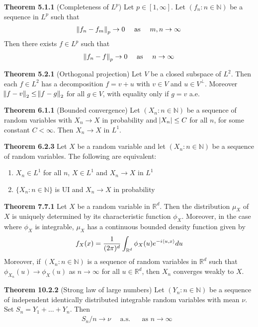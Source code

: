 \documentclass[hidelinks, 12pt]{article}
\theoremstyle{mydefstyle}
\theoremstyle{mythmstyle}
\begin{document}
\textbf{Theorem 5.1.1} (Completeness of $L^p$) Let $p \in [1, \infty]$. Let $(f_n : n \in \mathbb{N})$ be a sequence in $L^p$ such that
\begin{gather*}
\norm{f_n - f_m}_p \to 0 \quad\mbox{ as }\quad m, n \to \infty
\end{gather*}
Then there exists $f \in L^p$ such that
\begin{gather*}
\norm{f_n - f}_p \to 0 \quad\mbox{ as }\quad n \to \infty
\end{gather*}

\textbf{Theorem 5.2.1} (Orthogonal projection) Let $V$ be a closed subspace of $L^2$. Then each $f \in L^2$ has a decomposition $f = v + u$ with $v \in V$ and $u \in V^{\perp}$. Moreover $\norm{f - v}_2 \le \norm{f - g}_2$ for all $g \in V$, with equality only if $g = v$ a.e.

\textbf{Theorem 6.1.1} (Bounded convergence) Let $(X_n : n \in \mathbb{N})$ be a sequence of random variables with $X_n \to X$ in probability and $\abs{X_n} \le C$ for all $n$, for some constant $C < \infty$. Then $X_n \to X$ in $L^1$. 

\textbf{Theorem 6.2.3} Let $X$ be a random variable and let $(X_n : n \in \mathbb{N})$ be a sequence of random variables. The following are equivalent:
\begin{enumerate}[label = (\alph*)]
\item $X_n \in L^1$ for all $n$, $X \in L^1$ and $X_n \to X$ in $L^1$
\item $\{X_n : n \in \mathbb{N}\}$ is UI and $X_n \to X$ in probability
\end{enumerate}

\textbf{Theorem 7.7.1} Let $X$ be a random variable in $\mathbb{R}^d$. Then the distribution $\mu_X$ of $X$ is uniquely determined by its characteristic function $\phi_X$. Moreover, in the case where $\phi_X$ is integrable, $\mu_X$ has a continuous bounded density function given by
\begin{gather*}
f_X(x) = \frac{1}{(2\pi)^d} \int_{\mathbb{R}^d} \phi_X(u) e^{-i\braket{u, x}} du
\end{gather*}
Moreover, if $(X_n : n \in \mathbb{N})$ is a sequence of random variables in $\mathbb{R}^d$ such that $\phi_{X_n}(u) \to \phi_X(u)$ as $n \to \infty$ for all $u \in \mathbb{R}^d$, then $X_n$ converges weakly to $X$. 

\textbf{Theorem 10.2.2} (Strong law of large numbers) Let $(Y_n : n \in \mathbb{N})$ be a sequence of independent identically distributed integrable random variables with mean $\nu$. Set $S_n = Y_1 + \dots + Y_n$. Then
\begin{gather*}
S_n / n \to \nu \quad\mbox{ a.s. }\quad \mbox{ as $n \to \infty$ }
\end{gather*}
\end{document}
